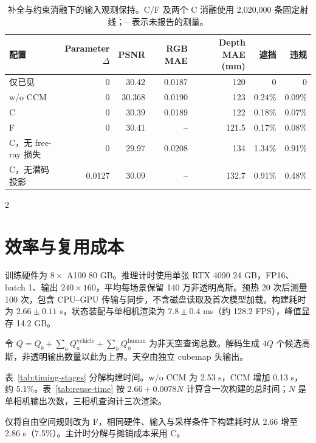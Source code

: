 \begin{table}[H]
\centering\small
\setlength{\tabcolsep}{4pt}
\caption{补全与约束消融下的输入观测保持。C/F 及两个 C 消融使用 2,020,000 条固定射线；-- 表示未报告的测量。}
\label{tab:preservation}
\begin{tabular}{@{}lrrrrrr@{}}
\toprule
配置 & Parameter $\Delta$ & PSNR & RGB MAE & Depth MAE (mm) & 遮挡 & 违规 \\
\midrule
仅已见 & 0 & 30.42 & 0.0187 & 120 & 0 & 0 \\
w/o CCM & 0 & 30.368 & 0.0190 & 123 & 0.24\% & 0.09\% \\
C & 0 & 30.39 & 0.0189 & 122 & 0.18\% & 0.07\% \\
F & 0 & 30.41 & -- & 121.5 & 0.17\% & 0.08\% \\
C，无 free-ray 损失 & 0 & 29.97 & 0.0208 & 134 & 1.34\% & 0.91\% \\
C，无潜码投影 & 0.0127 & 30.09 & -- & 132.7 & 0.91\% & 0.48\% \\
\bottomrule
\end{tabular}
\end{table}
\begin{multicols}{2}

\section{效率与复用成本}
\label{sec:supp-timing}

训练硬件为 $8\times$ A100 80 GB。推理计时使用单张 RTX 4090 24 GB，FP16、batch 1、输出 $240\times160$，平均每场景保留 140 万非透明高斯。预热 20 次后测量 100 次，包含 CPU--GPU 传输与同步，不含磁盘读取及首次模型加载。构建耗时为 $2.66\pm0.11$ s，状态装配与单相机渲染为 $7.8\pm0.4$ ms（约 128.2 FPS），峰值显存 14.2 GB。

令 $Q=Q_b+\sum_a Q_a^{\mathrm{vehicle}}+\sum_h Q_h^{\mathrm{human}}$ 为非天空查询总数。解码生成 $4Q$ 个候选高斯，非透明输出数量以此为上界。天空由独立 cubemap 头输出。

表~\ref{tab:timing-stages} 分解构建时间。w/o CCM 为 2.53 s，CCM 增加 0.13 s，约 5.1\%。表~\ref{tab:reuse-time} 按 $2.66+0.0078N$ 计算含一次构建的总时间；$N$ 是单相机输出次数，三相机查询计三次渲染。

仅将自由空间规则改为 F，相同硬件、输入与采样条件下构建耗时从 2.66 增至 2.86 s（7.5\%）。主计时分解与摊销成本采用 C。

\end{multicols}
